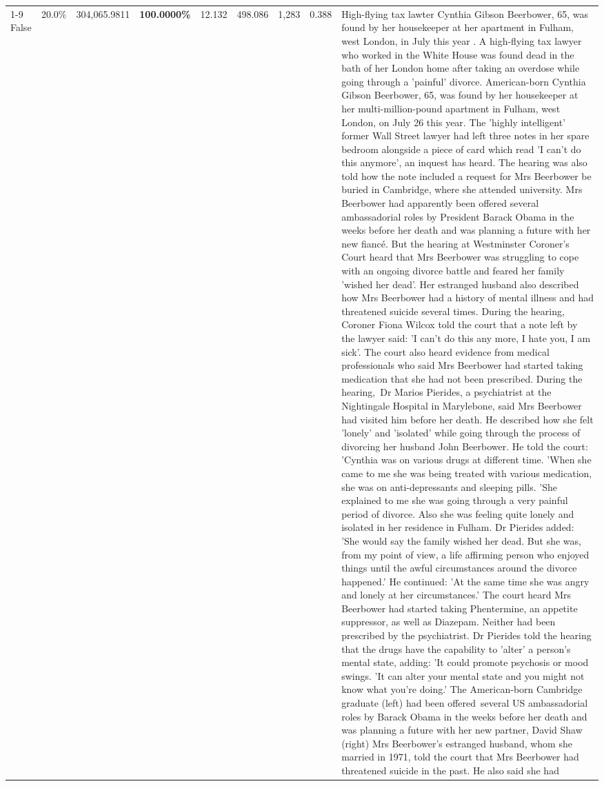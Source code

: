 \begin{table}[H]
\begin{tabular}{lllrlllll}
\cline{1-9}
False & 20.0\% & \color{red} 304,065.9811 & \bfseries \color{red} 100.0000\% & 12.132 & 498.086 & 1,283 & 0.388 & High-flying tax lawter Cynthia Gibson Beerbower, 65, was found by her housekeeper at her apartment in Fulham, west London, in July this year . A high-flying tax lawyer who worked in the White House was found dead in the bath of her London home after taking an overdose while going through a 'painful' divorce. American-born Cynthia Gibson Beerbower, 65, was found by her housekeeper at her multi-million-pound apartment in Fulham, west London, on July 26 this year. The 'highly intelligent' former Wall Street lawyer had left three notes in her spare bedroom alongside a piece of card which read 'I can't do this anymore', an inquest has heard. The hearing was also told how the note included a request for Mrs Beerbower be buried in Cambridge, where she attended university. Mrs Beerbower had apparently been offered several ambassadorial roles by President Barack Obama in the weeks before her death and was planning a future with her new fiancé. But the hearing at Westminster Coroner's Court heard that Mrs Beerbower was struggling to cope with an ongoing divorce battle and feared her family 'wished her dead'. Her estranged husband also described how Mrs Beerbower had a history of mental illness and had threatened suicide several times. During the hearing, Coroner Fiona Wilcox told the court that a note left by the lawyer said: 'I can't do this any more, I hate you, I am sick'. The court also heard evidence from medical professionals who said Mrs Beerbower had started taking medication that she had not been prescribed. During the hearing, Dr Marios Pierides, a psychiatrist at the Nightingale Hospital in Marylebone, said Mrs Beerbower had visited him before her death. He described how she felt 'lonely' and 'isolated' while going through the process of divorcing her husband John Beerbower. He told the court: 'Cynthia was on various drugs at different time. 'When she came to me she was being treated with various medication, she was on anti-depressants and sleeping pills. 'She explained to me she was going through a very painful period of divorce. Also she was feeling quite lonely and isolated in her residence in Fulham. Dr Pierides added: 'She would say the family wished her dead. But she was, from my point of view, a life affirming person who enjoyed things until the awful circumstances around the divorce happened.' He continued: 'At the same time she was angry and lonely at her circumstances.' The court heard Mrs Beerbower had started taking Phentermine, an appetite suppressor, as well as Diazepam. Neither had been prescribed by the psychiatrist. Dr Pierides told the hearing that the drugs have the capability to 'alter' a person's mental state, adding: 'It could promote psychosis or mood swings. 'It can alter your mental state and you might not know what you're doing.' The American-born Cambridge graduate (left) had been offered several US ambassadorial roles by Barack Obama in the weeks before her death and was planning a future with her new partner, David Shaw (right) Mrs Beerbower's estranged husband, whom she married in 1971, told the court that Mrs Beerbower had threatened suicide in the past. He also said she had 
\end{tabular}
\end{table}
